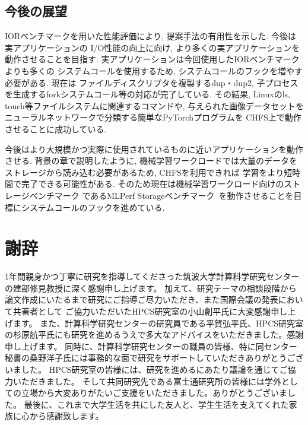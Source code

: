 \documentclass[a4paper,11pt]{jreport}
\begin{document}
\section{今後の展望}
IORベンチマークを用いた性能評価により, 提案手法の有用性を示した. 今後は実アプリケーションの
I/O性能の向上に向け, より多くの実アプリケーションを動作させることを目指す. 実アプリケーションは今回使用したIORベンチマークよりも多くの
システムコールを使用するため, システムコールのフックを増やす必要がある. 現在は
ファイルディスクリプタを複製するdup・dup2, 子プロセスを生成するforkシステムコール等の対応が完了している. その結果, Linuxのls, 
touch等ファイルシステムに関連するコマンドや, 与えられた画像データセットをニューラルネットワークで分類する簡単なPyTorchプログラムを
CHFS上で動作させることに成功している. 

今後はより大規模かつ実際に使用されているものに近いアプリケーションを動作させる. 
背景の章で説明したように, 機械学習ワークロードでは大量のデータをストレージから読み込む必要があるため, CHFSを利用できれば
学習をより短時間で完了できる可能性がある. そのため現在は機械学習ワークロード向けのストレージベンチマーク
であるMLPerf Storageベンチマーク~\cite{mlperfstorage}を動作させることを目標にシステムコールのフックを進めている. 

\chapter*{謝辞}
1年間親身かつ丁寧に研究を指導してくださった筑波大学計算科学研究センターの建部修見教授に深く感謝申し上げます。
加えて、研究テーマの相談段階から論文作成にいたるまで研究にご指導ご尽力いただき、また国際会議の発表において共著者として
ご協力いただいたHPCS研究室の小山創平氏に大変感謝申し上げます。
また、計算科学研究センターの研究員である平賀弘平氏、HPCS研究室の杉原航平氏にも研究を進めるうえで多大なアドバイスをいただきました。感謝申し上げます。
同時に、計算科学研究センターの職員の皆様、特に同センター秘書の桑野洋子氏には事務的な面で研究をサポートしていただきありがとうございました。
HPCS研究室の皆様には、研究を進めるにあたり議論を通じてご協力いただきました。
そして共同研究先である富士通研究所の皆様には学外としての立場から大変ありがたいご支援をいただきました。ありがとうございました。
最後に、これまで大学生活を共にした友人と、学生生活を支えてくれた家族に心から感謝致します。

\newpage

\renewcommand{\bibname}{参考文献}



\end{document}
